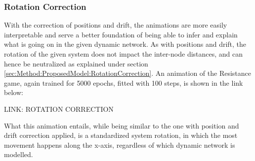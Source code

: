 \subsubsection{Rotation Correction}
\label{sec:ResearchQuestion3:RotationCorrection}
With the correction of positions and drift, the animations are more easily interpretable and serve a better foundation of being able to infer and explain what is going on in the given dynamic network.
As with positions and drift, the rotation of the given system does not impact the inter-node distances, and can hence be neutralized as explained under section \ref{sec:Method:ProposedModel:RotationCorrection}.
An animation of the Resistance game, again trained for 5000 epochs, fitted with 100 steps, is shown in the link below:
\begin{center}
LINK: ROTATION CORRECTION
\end{center}
\noindent
What this animation entails, while being similar to the one with position and drift correction applied, is a standardized system rotation, in which the most movement happens along the x-axis, regardless of which dynamic network is modelled.


